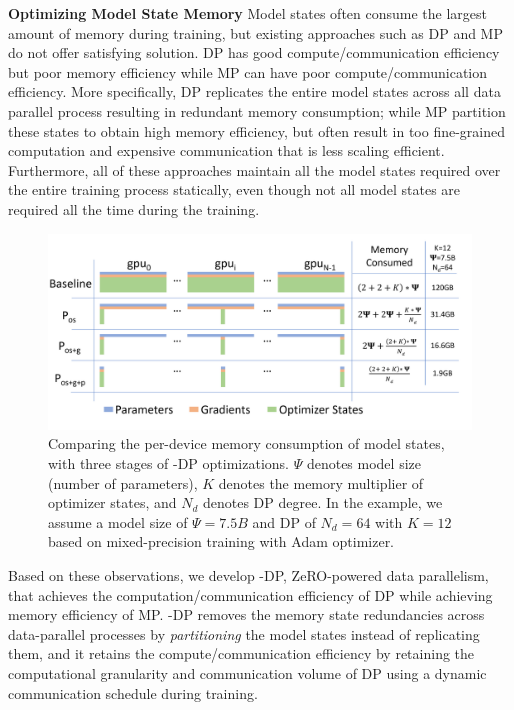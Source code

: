 {\bf Optimizing Model State Memory}
Model states often consume the largest amount of memory during training, but existing approaches such as DP and MP do not offer satisfying solution.  DP has good compute/communication efficiency but poor memory efficiency while MP can have poor compute/communication efficiency. More specifically, DP replicates the entire model states across all data parallel process resulting in redundant memory consumption;
while MP partition these states to obtain high memory efficiency, but often result in too fine-grained computation and expensive communication that is less scaling efficient.
Furthermore, all of these approaches maintain all the model states required over the entire
training process statically, even though not all model states are required all the time during
the training.
\begin{figure}[t!]
 \begin{center}
 \includegraphics[width=1.0\columnwidth]{memory-consumption-v4.PNG}
 \caption{Comparing the per-device memory consumption of model states, with three stages of \name-DP optimizations. $\Psi$ denotes model size (number of parameters), $K$ denotes the memory multiplier of optimizer states, and $N_d$ denotes DP degree.  In the example, we assume a model size of $\Psi=7.5B$ and DP of $N_d=64$ with $K=12$ based on mixed-precision training with Adam optimizer. } 
 \label{fig:memory-consumption}
 \end{center}
 \end{figure}
Based on these observations, we develop \name-DP, ZeRO-powered data parallelism, that achieves the computation/communication efficiency of DP while achieving memory efficiency of MP.  \name-DP removes the memory state redundancies across data-parallel processes by \emph{partitioning} the model states instead of replicating them, and it retains the compute/communication efficiency by retaining the computational granularity and communication volume of DP using a dynamic communication schedule during training.  

